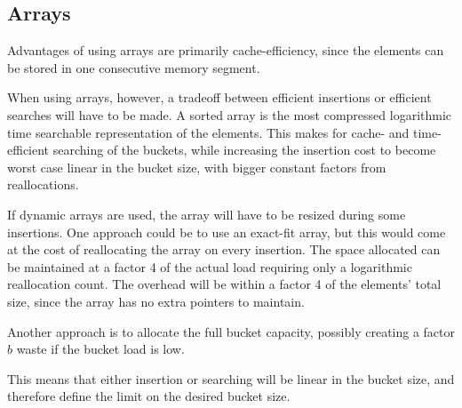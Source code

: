 \subsection{Arrays}
Advantages of using arrays are primarily cache-efficiency, since the
elements can be stored in one consecutive memory segment.

When using arrays, however, a tradeoff between efficient insertions or
efficient searches will have to be made. A sorted array is the most compressed
logarithmic time searchable representation of the elements. This makes for
cache- and time-efficient searching of the buckets, while increasing the
insertion cost to become worst case linear in the bucket size, with bigger
constant factors from reallocations.

If dynamic arrays are used, the array will have to be resized during some
insertions. One approach could be to use an exact-fit array, but this would
come at the cost of reallocating the array on every insertion. The space
allocated can be maintained at a factor 4 of the actual load requiring only a
logarithmic reallocation count. The overhead will be within a factor 4 of the
elements' total size, since the array has no extra pointers to maintain.

Another approach is to allocate the full bucket capacity, possibly creating a
factor $b$ waste if the bucket load is low.

This means that either insertion or searching will be linear in the bucket
size, and therefore define the limit on the desired bucket size.

